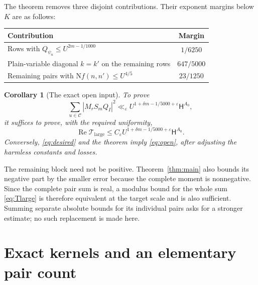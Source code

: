 \documentclass[11pt]{article}
\newtheorem{corollary}[theorem]{Corollary}
\theoremstyle{definition}
\theoremstyle{remark}
\numberwithin{equation}{section}
\newcommand{\Nm}{\mathrm N}
\newcommand{\CC}{\mathcal C}
\newcommand{\HH}{\mathsf H}
\newcommand{\Rea}{\operatorname{Re}}
\newcommand{\ee}{\varepsilon}
\newcommand{\Tlarge}{\mathcal T_{\mathrm{large}}}
\begin{document}
The theorem removes three disjoint contributions. Their exponent
margins below $K$ are as follows:
\begin{center}
\begin{tabular}{@{}p{}c@{}}
\toprule
Contribution & Margin\\
\midrule
Rows with $Q_{\psi_u}\le U^{2m-1/1000}$ & $1/6250$\\
Plain-variable diagonal $k=k'$ on the remaining rows & $647/5000$\\
Remaining pairs with $\Nm f(n,n')\le U^{4/5}$ & $23/1250$\\
\bottomrule
\end{tabular}
\end{center}

\begin{corollary}[The exact open input]\label{cor:open}
To prove
\begin{equation}\label{eq:desired}
\sum_{u\in\CC}|M_rS_mQ_I|^2
\ll_\ee U^{1+\delta m-1/5000+\ee}\HH^{A_0},
\end{equation}
it suffices to prove, with the required uniformity,
\begin{equation}\label{eq:open}
\Rea\Tlarge\le C_\ee U^{1+\delta m-1/5000+\ee}\HH^{A_0}.
\end{equation}
Conversely, \eqref{eq:desired} and the theorem imply
\eqref{eq:open}, after adjusting the harmless constants and losses.
\end{corollary}

The remaining block need not be positive. Theorem~\ref{thm:main}
also bounds its negative part by the smaller error because the complete
moment is nonnegative. Since the complete pair sum is real, a modulus
bound for the whole sum \eqref{eq:Tlarge} is therefore equivalent at
the target scale and is also sufficient. Summing separate absolute
bounds for its individual pairs asks for a stronger estimate; no such
replacement is made here.

\section{Exact kernels and an elementary pair count}\label{sec:pairs}
\end{document}
